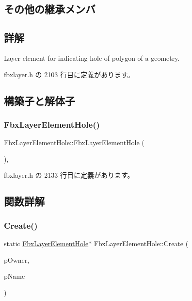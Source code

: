 \subsection*{その他の継承メンバ}


\subsection{詳解}
Layer element for indicating hole of polygon of a geometry. 

 fbxlayer.\+h の 2103 行目に定義があります。



\subsection{構築子と解体子}
\mbox{\label{class_fbx_layer_element_hole_aa16cc2aabce4cbb8b03dd1206778a30f}} 
\subsubsection{\texorpdfstring{Fbx\+Layer\+Element\+Hole()}{FbxLayerElementHole()}}
{\footnotesize\ttfamily Fbx\+Layer\+Element\+Hole\+::\+Fbx\+Layer\+Element\+Hole (\begin{DoxyParamCaption}{ }\end{DoxyParamCaption})\hspace{0.3cm}{\ttfamily [inline]}, {\ttfamily [protected]}}



 fbxlayer.\+h の 2133 行目に定義があります。



\subsection{関数詳解}
\mbox{\label{class_fbx_layer_element_hole_ae2e9be9ff1db47440c55d72f00f4ef61}} 
\subsubsection{\texorpdfstring{Create()}{Create()}}
{\footnotesize\ttfamily static \hyperlink{class_fbx_layer_element_hole}{Fbx\+Layer\+Element\+Hole}$\ast$ Fbx\+Layer\+Element\+Hole\+::\+Create (\begin{DoxyParamCaption}\item[{\hyperlink{class_fbx_layer_container}{Fbx\+Layer\+Container} $\ast$}]{p\+Owner,  }\item[{const char $\ast$}]{p\+Name }\end{DoxyParamCaption})\hspace{0.3cm}{\ttfamily [static]}}

